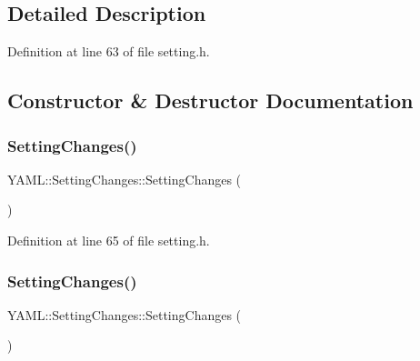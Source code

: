\subsection{Detailed Description}


Definition at line 63 of file setting.\+h.



\subsection{Constructor \& Destructor Documentation}
\mbox{\label{class_y_a_m_l_1_1_setting_changes_a873fb8088408ec026587855426c4f135}} 
\subsubsection{\texorpdfstring{SettingChanges()}{SettingChanges()}\hspace{0.1cm}{\footnotesize\ttfamily [1/3]}}
{\footnotesize\ttfamily Y\+A\+M\+L\+::\+Setting\+Changes\+::\+Setting\+Changes (\begin{DoxyParamCaption}{ }\end{DoxyParamCaption})\hspace{0.3cm}{\ttfamily [inline]}}



Definition at line 65 of file setting.\+h.

\mbox{\label{class_y_a_m_l_1_1_setting_changes_a23d702f3f42ac5419aa1897c32f181ba}} 
\subsubsection{\texorpdfstring{SettingChanges()}{SettingChanges()}\hspace{0.1cm}{\footnotesize\ttfamily [2/3]}}
{\footnotesize\ttfamily Y\+A\+M\+L\+::\+Setting\+Changes\+::\+Setting\+Changes (\begin{DoxyParamCaption}\item[{const \mbox{\hyperlink{class_y_a_m_l_1_1_setting_changes}{Setting\+Changes}} \&}]{ }\end{DoxyParamCaption})\hspace{0.3cm}{\ttfamily [delete]}}

